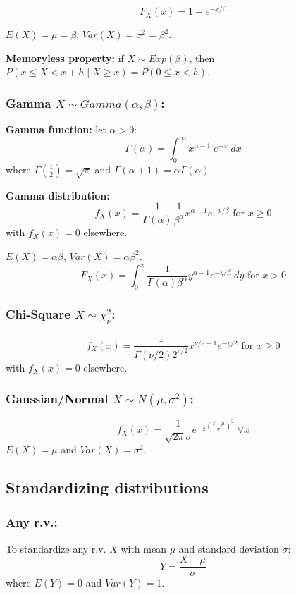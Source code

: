 \documentclass[15pt]{article}
\begin{document}
\[
    F_X (x) = 1 - e^{-x / \beta}
\]

$E(X) = \mu = \beta$, $Var(X) = \sigma^2 = \beta^2$.

\textbf{Memoryless property:} if $X \sim Exp(\beta)$, then $P(x \leq X < x+h \; | \; X \geq x) = P(0 \leq x < h)$.

\subsubsection{Gamma $X \sim Gamma(\alpha, \beta)$:}
\textbf{Gamma function:} let $\alpha > 0$:
\[
    \Gamma (\alpha) = \int_0^{\infty} x^{\alpha - 1} \; e^{-x} \; dx
\] where $\Gamma(\frac{1}{2}) = \sqrt{\pi}$ and $\Gamma(\alpha + 1) = \alpha \Gamma(\alpha)$.

\textbf{Gamma distribution:}
\[
    f_X (x) = \frac{1}{\Gamma (\alpha)} \frac{1}{\beta^{\alpha}} x^{\alpha - 1} e^{-x / \beta} \text{ for } x \geq 0
\] with $f_X (x) = 0$ elsewhere.

$E(X) = \alpha \beta$, $Var(X) = \alpha \beta^2$.
\[
    F_X (x) = \int_0^x \frac{1}{\Gamma (\alpha) \beta^{\alpha}} y^{\alpha - 1} e^{-y / \beta} \; dy  \text{ for } x > 0
\]

\subsubsection{Chi-Square $X \sim \chi_{\nu}^2$:}
\[
    f_X (x) = \frac{1}{\Gamma (\nu / 2) 2^{\nu / 2}} x^{\nu / 2 - 1} e^{-y / 2} \text{ for } x \geq 0
\] with $f_X (x) = 0$ elsewhere.

\subsubsection{Gaussian/Normal $X \sim N(\mu, \sigma^2)$:}
\[
    f_X (x) = \frac{1}{\sqrt{2 \pi} \sigma} e^{-\frac{1}{2} \left(\frac{x - \mu}{\sigma}\right)^2} \; \forall x
\]
$E(X) = \mu$ and $Var(X) = \sigma^2$.

\subsection{Standardizing distributions}
\subsubsection{Any r.v.:}
To standardize any r.v. $X$ with mean $\mu$ and standard deviation $\sigma$:
\[
    Y = \frac{X - \mu}{\sigma}
\]
where $E(Y) = 0$ and $Var(Y) = 1$. 
\end{document}
